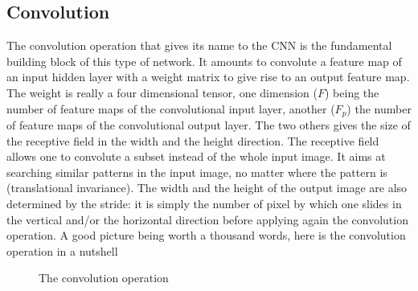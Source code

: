 \subsection{Convolution}

The convolution operation that gives its name to the CNN is the fundamental building block of this type of network. It amounts to convolute a feature map of an input hidden layer with a weight matrix to give rise to an output feature map. The weight is really a four dimensional tensor, one dimension ($F$) being the number of feature maps of the convolutional input layer, another ($F_p$) the number of feature maps of the convolutional output layer. The two others gives the size of the receptive field in the width and the height direction. The receptive field allows one to convolute a subset instead of the whole input image. It aims at searching similar patterns in the input image, no matter where the pattern is (translational invariance). The width and the height of the output image are also determined by the stride: it is simply the number of pixel by which one slides in the vertical and/or the horizontal direction before applying again the convolution operation. A good picture being worth a thousand words, here is the convolution operation in a nutshell

\begin{figure}[H]
\begin{center}
\caption{The convolution operation}
\end{center}
\end{figure}

